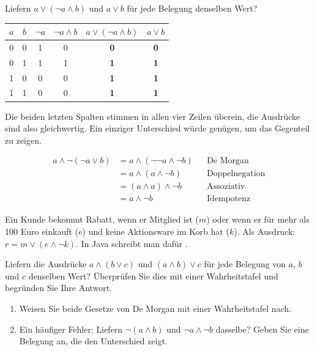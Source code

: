 \beispiele
{}
Liefern $a \vee (\neg a \wedge b)$ und $a \vee b$ für jede Belegung denselben Wert?
\begin{center}
\begin{tabular}{cc|cc|c|c}
$a$ & $b$ & $\neg a$ & $\neg a \wedge b$ & $a \vee (\neg a \wedge b)$ & $a \vee b$ \\ \hline
0 & 0 & 1 & 0 & \textbf{0} & \textbf{0} \\
0 & 1 & 1 & 1 & \textbf{1} & \textbf{1} \\
1 & 0 & 0 & 0 & \textbf{1} & \textbf{1} \\
1 & 1 & 0 & 0 & \textbf{1} & \textbf{1}
\end{tabular}
\end{center}
Die beiden letzten Spalten stimmen in allen vier Zeilen überein, die Ausdrücke sind also gleichwertig. Ein einziger Unterschied würde genügen, um das Gegenteil zu zeigen.

\begin{align*}
a \wedge \neg(\neg a \vee b)
&= a \wedge (\neg\neg a \wedge \neg b) && \text{De Morgan} \\
&= a \wedge (a \wedge \neg b) && \text{Doppelnegation} \\
&= (a \wedge a) \wedge \neg b && \text{Assoziativ} \\
&= a \wedge \neg b && \text{Idempotenz}
\end{align*}

Ein Kunde bekommt Rabatt, wenn er Mitglied ist ($m$) oder wenn er für mehr als 100 Euro einkauft ($e$) und keine Aktionsware im Korb hat ($k$). Als Ausdruck: $r = m \vee (e \wedge \neg k)$. In Java schreibt man dafür .

\aufgaben
{}
Liefern die Ausdrücke $a \wedge (b \vee c)$ und $(a \wedge b) \vee c$ für jede Belegung von $a$, $b$ und $c$ denselben Wert? Überprüfen Sie dies mit einer Wahrheitstafel und begründen Sie Ihre Antwort.

\begin{enumerate}[label=\alph*)]
\item Weisen Sie beide Gesetze von De Morgan mit einer Wahrheitstafel nach.
\item Ein häufiger Fehler: Liefern $\neg(a \wedge b)$ und $\neg a \wedge \neg b$ dasselbe? Geben Sie eine Belegung an, die den Unterschied zeigt.
\end{enumerate}

